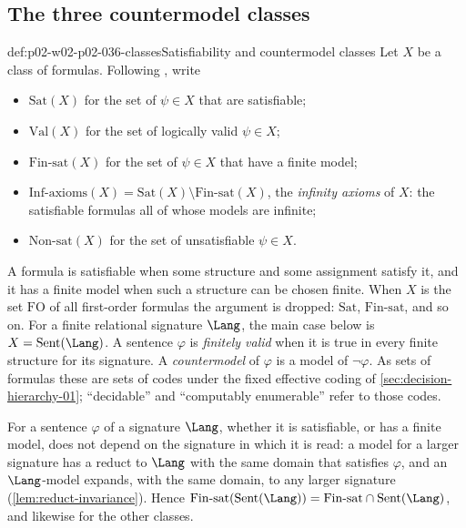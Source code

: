 \subsection{The three countermodel classes}
\label{sec:p02-w02-p02-036-classes}

\begin{hbdefinition}{def:p02-w02-p02-036-classes}{Satisfiability and countermodel classes}
Let \(X\) be a class of formulas.  Following
\cite[Sect.~2.1.2, Def.~2.1.27]{BorgerGradelGurevich1997}, write
\begin{itemize}
\item \(\mathrm{Sat}(X)\) for the set of \(\psi\in X\) that are satisfiable;
\item \(\mathrm{Val}(X)\) for the set of logically valid \(\psi\in X\);
\item \(\mathrm{Fin\text{-}sat}(X)\) for the set of \(\psi\in X\) that have a
      finite model;
\item \(\mathrm{Inf\text{-}axioms}(X)=\mathrm{Sat}(X)\setminus
      \mathrm{Fin\text{-}sat}(X)\), the \emph{infinity axioms} of \(X\): the
      satisfiable formulas all of whose models are infinite;
\item \(\mathrm{Non\text{-}sat}(X)\) for the set of unsatisfiable
      \(\psi\in X\).
\end{itemize}
A formula is satisfiable when some structure and some assignment satisfy it,
and it has a finite model when such a structure can be chosen finite.  When
\(X\) is the set \(\mathrm{FO}\) of all first-order formulas the argument is
dropped: \(\mathrm{Sat}\), \(\mathrm{Fin\text{-}sat}\), and so on.  For a
finite relational signature \(\Lang\), the main case below is
\(X=\operatorname{Sent}(\Lang)\).  A sentence \(\varphi\) is \emph{finitely
valid} when it is true in every finite structure for its signature.  A
\emph{countermodel} of \(\varphi\) is a model of \(\neg\varphi\).  As sets of
formulas these are sets of codes under the fixed effective coding of
\cref{sec:decision-hierarchy-01}; ``decidable'' and ``computably enumerable''
refer to those codes.
\end{hbdefinition}

For a sentence \(\varphi\) of a signature \(\Lang\), whether it is
satisfiable, or has a finite model, does not depend on the signature in which
it is read: a model for a larger signature has a reduct to \(\Lang\) with the
same domain that satisfies \(\varphi\), and an \(\Lang\)-model expands, with
the same domain, to any larger signature (\cref{lem:reduct-invariance}).
Hence \(\mathrm{Fin\text{-}sat}(\operatorname{Sent}(\Lang))=
\mathrm{Fin\text{-}sat}\cap\operatorname{Sent}(\Lang)\), and likewise for the
other classes.

